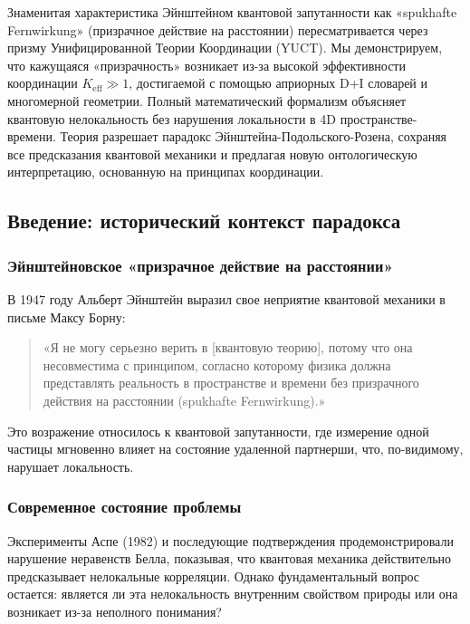 \documentclass[11pt,a4paper]{article}
\begin{document}
	\begin{center}
		
	\end{center}
	
	Знаменитая характеристика Эйнштейном квантовой запутанности как «spukhafte Fernwirkung» (призрачное действие на расстоянии) пересматривается через призму Унифицированной Теории Координации (YUCT). Мы демонстрируем, что кажущаяся «призрачность» возникает из-за высокой эффективности координации $K_{\mathrm{eff}} \gg 1$, достигаемой с помощью априорных D+I словарей и многомерной геометрии. Полный математический формализм объясняет квантовую нелокальность без нарушения локальности в 4D пространстве-времени. Теория разрешает парадокс Эйнштейна-Подольского-Розена, сохраняя все предсказания квантовой механики и предлагая новую онтологическую интерпретацию, основанную на принципах координации.
	
	
	\subsection{Введение: исторический контекст парадокса}
	\label{subsec:einstein-historical}
	
	\subsubsection{Эйнштейновское «призрачное действие на расстоянии»}
	В 1947 году Альберт Эйнштейн выразил свое неприятие квантовой механики в письме Максу Борну:
	
	\begin{quote}
		«Я не могу серьезно верить в [квантовую теорию], потому что она несовместима с принципом, согласно которому физика должна представлять реальность в пространстве и времени без призрачного действия на расстоянии (spukhafte Fernwirkung).»
	\end{quote}
	
	Это возражение относилось к квантовой запутанности, где измерение одной частицы мгновенно влияет на состояние удаленной партнерши, что, по-видимому, нарушает локальность.
	
	\subsubsection{Современное состояние проблемы}
	Эксперименты Аспе (1982) и последующие подтверждения продемонстрировали нарушение неравенств Белла, показывая, что квантовая механика действительно предсказывает нелокальные корреляции. Однако фундаментальный вопрос остается: является ли эта нелокальность внутренним свойством природы или она возникает из-за неполного понимания?
	
\end{document}
